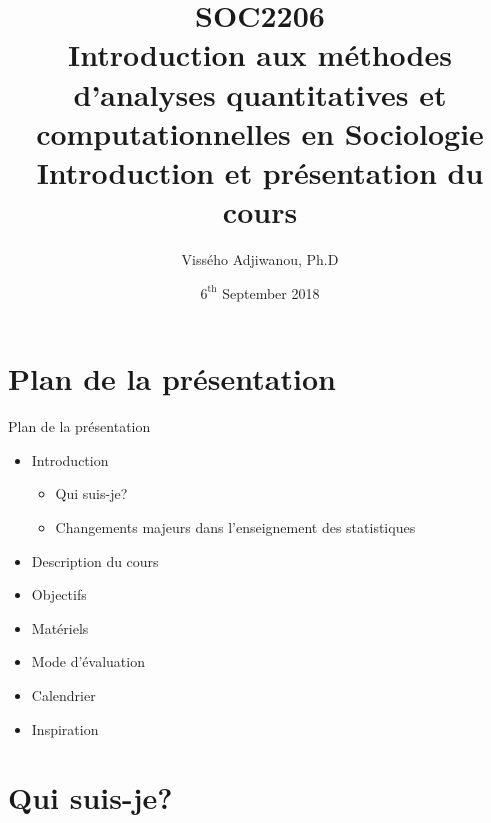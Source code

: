 \documentclass[xcolor=table]{beamer}
\title[Méthodes d'analyses quantitatives]{\textbf{SOC2206} \\
Introduction aux méthodes d'analyses quantitatives et computationnelles en Sociologie \\
\textbf{Introduction et présentation du cours}}
\author{Vissého Adjiwanou, Ph.D}
\institute[Sociologie]{\bf Département de Sociologie, UQAM}
\date{$6^{\text{th}}$ September 2018}
\begin{document}
\begin{frame}
  \titlepage
\end{frame}


\section{Plan de la présentation}

\begin{frame}{Plan de la présentation}

\begin{itemize}
  	\item Introduction 
  	\begin{itemize}
  	    \item Qui suis-je?
  	    \item Changements majeurs dans l'enseignement des statistiques
  	\end{itemize}
    \item Description du cours
	\item Objectifs
	\item Matériels
	\item Mode d'évaluation
	\item Calendrier
    \item Inspiration
    
\end{itemize}


\end{frame}

\section{Qui suis-je?}
\end{document}
